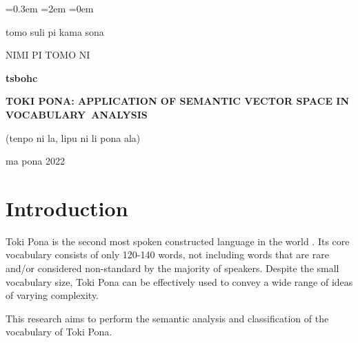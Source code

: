 \documentclass[14pt, a4paper]{extreport}
\begin{document}
\sloppy
{}\font=0.3em %
\font=2em %
\font=0em %

\begin{titlepage}
  \begin{center}
    tomo suli pi kama sona

    NIMI PI TOMO NI

    \vfill

    \textbf{tsbohc}

    \large
    \textbf{TOKI PONA: APPLICATION OF SEMANTIC VECTOR SPACE IN VOCABULARY~ANALYSIS}

    \normalsize

    \bigskip
    (tenpo ni la, lipu ni li pona ala) 

    \bigskip


    \vfill
    ma pona 2022

  \end{center}
\end{titlepage}

\setcounter{page}{2}
\restoregeometry

\renewcommand{\contentsname}{\let\clearpage\relax\chapter*{Contents}} %
\tableofcontents




\chapter{Introduction}

Toki Pona is the second most spoken constructed language in the world \parencite{iso}. Its core vocabulary consists of only 120-140 words, not including words that are rare and/or considered non-standard by the majority of speakers. Despite the small vocabulary size, Toki Pona can be effectively used to convey a wide range of ideas of varying complexity.

This research aims to perform the semantic analysis and classification of the vocabulary of Toki Pona.
\end{document}
